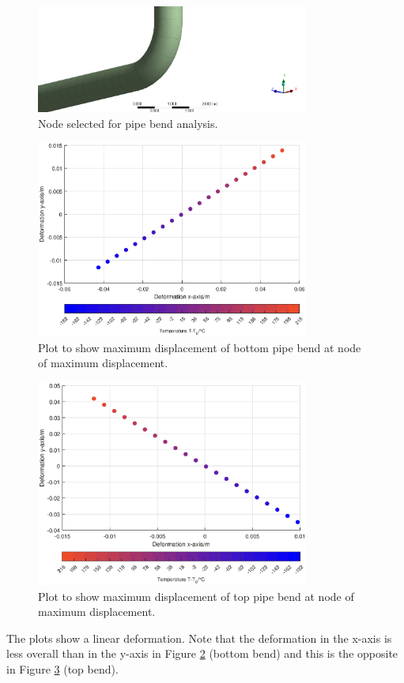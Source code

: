 \begin{figure}[H]
    \centering
    \includegraphics[width = 0.8\textwidth]{img/part2b-5.png}
    \caption{Node selected for pipe bend analysis.}
    \label{part2b4}
\end{figure}
\begin{figure}[H]
    \centering
    \includegraphics[width = 0.8\textwidth]{img/part2bi.eps}
    \caption{Plot to show maximum displacement of bottom pipe bend at node of maximum displacement.}
    \label{part2b5}
\end{figure}
\begin{figure}[H]
    \centering
    \includegraphics[width = 0.8\textwidth]{img/part2bii.eps}
    \caption{Plot to show maximum displacement of top pipe bend at node of maximum displacement.}
    \label{part2b6}
\end{figure}
The plots show a linear deformation. Note that the deformation in the x-axis is less overall than in the y-axis in Figure \ref{part2b5} (bottom bend) and this is the opposite in Figure \ref{part2b6} (top bend).
